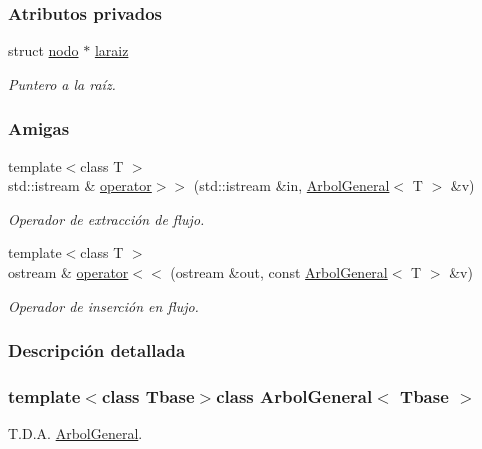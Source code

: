 \subsubsection*{Atributos privados}
\begin{DoxyCompactItemize}
\item 
struct \hyperlink{structArbolGeneral_1_1nodo}{nodo} $\ast$ \hyperlink{classArbolGeneral_a14a859dc79b8df4d5a77b5c871713c9e}{laraiz}
\begin{DoxyCompactList}\small\item\em Puntero a la raíz. \end{DoxyCompactList}\end{DoxyCompactItemize}
\subsubsection*{Amigas}
\begin{DoxyCompactItemize}
\item 
{\footnotesize template$<$class T $>$ }\\std\-::istream \& \hyperlink{classArbolGeneral_ab1318141f030856da7dcfc1c7a162565}{operator$>$$>$} (std\-::istream \&in, \hyperlink{classArbolGeneral}{Arbol\-General}$<$ T $>$ \&v)
\begin{DoxyCompactList}\small\item\em Operador de extracción de flujo. \end{DoxyCompactList}\item 
{\footnotesize template$<$class T $>$ }\\ostream \& \hyperlink{classArbolGeneral_a2b19e120d650b0363eed1bfd8c7f5351}{operator$<$$<$} (ostream \&out, const \hyperlink{classArbolGeneral}{Arbol\-General}$<$ T $>$ \&v)
\begin{DoxyCompactList}\small\item\em Operador de inserción en flujo. \end{DoxyCompactList}\end{DoxyCompactItemize}


\subsubsection{Descripción detallada}
\subsubsection*{template$<$class Tbase$>$class Arbol\-General$<$ Tbase $>$}

T.\-D.\-A. \hyperlink{classArbolGeneral}{Arbol\-General}. 

